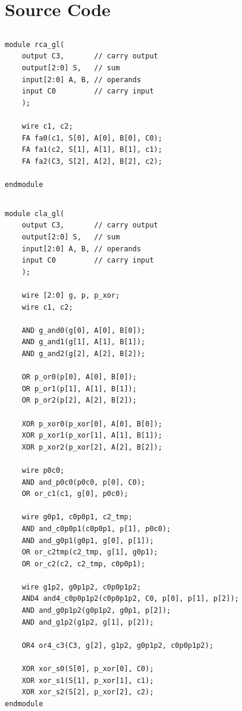 \documentclass[12pt]{article}
\title{\mytitle}
\author{\myauthor}
\date{\today}
\begin{document}
\maketitle

\section{Source Code}
\subsection{}
\begin{verbatim}
module rca_gl(
	output C3,       // carry output
	output[2:0] S,   // sum
	input[2:0] A, B, // operands
	input C0         // carry input
	);

	wire c1, c2;
	FA fa0(c1, S[0], A[0], B[0], C0);
	FA fa1(c2, S[1], A[1], B[1], c1);
	FA fa2(C3, S[2], A[2], B[2], c2);
	
endmodule
\end{verbatim}

\subsection{}
\begin{verbatim}
module cla_gl(
    output C3,       // carry output
    output[2:0] S,   // sum
    input[2:0] A, B, // operands
    input C0         // carry input
    );

    wire [2:0] g, p, p_xor;
    wire c1, c2;

    AND g_and0(g[0], A[0], B[0]);
    AND g_and1(g[1], A[1], B[1]);
    AND g_and2(g[2], A[2], B[2]);

    OR p_or0(p[0], A[0], B[0]);
    OR p_or1(p[1], A[1], B[1]);
    OR p_or2(p[2], A[2], B[2]);

    XOR p_xor0(p_xor[0], A[0], B[0]);
    XOR p_xor1(p_xor[1], A[1], B[1]);
    XOR p_xor2(p_xor[2], A[2], B[2]);

    wire p0c0;
    AND and_p0c0(p0c0, p[0], C0);
    OR or_c1(c1, g[0], p0c0);

    wire g0p1, c0p0p1, c2_tmp;
    AND and_c0p0p1(c0p0p1, p[1], p0c0);
    AND and_g0p1(g0p1, g[0], p[1]);
    OR or_c2tmp(c2_tmp, g[1], g0p1);
    OR or_c2(c2, c2_tmp, c0p0p1);

    wire g1p2, g0p1p2, c0p0p1p2;
    AND4 and4_c0p0p1p2(c0p0p1p2, C0, p[0], p[1], p[2]);
    AND and_g0p1p2(g0p1p2, g0p1, p[2]);
    AND and_g1p2(g1p2, g[1], p[2]);

    OR4 or4_c3(C3, g[2], g1p2, g0p1p2, c0p0p1p2);

    XOR xor_s0(S[0], p_xor[0], C0);
    XOR xor_s1(S[1], p_xor[1], c1);
    XOR xor_s2(S[2], p_xor[2], c2);
endmodule
\end{verbatim}
\end{document}

